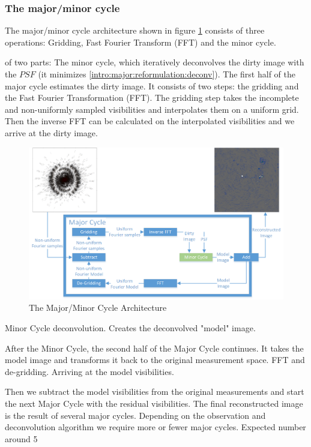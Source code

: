 \subsubsection{The major/minor cycle}
The major/minor cycle architecture shown in figure \ref{intro:major:fig} consists of three operations: Gridding, Fast Fourier Transform (FFT) and the minor cycle.

 of two parts: The minor cycle, which iteratively deconvolves the dirty image with the $PSF$ (it minimizes \eqref{intro:major:reformulation:deconv}). The first half of the major cycle estimates the dirty image. It consists of two steps: the gridding and the Fast Fourier Transformation (FFT). The gridding step takes the incomplete and non-uniformly sampled visibilities and interpolates them on a uniform grid. Then the inverse FFT can be calculated on the interpolated visibilities and we arrive at the dirty image.

\begin{figure}[h]
	\centering
	\includegraphics[width=0.90\linewidth]{./chapters/02.hypo/Major-Minor3.png}
	\caption{The Major/Minor Cycle Architecture}
	\label{intro:major:fig}
\end{figure}

Minor Cycle deconvolution. Creates the deconvolved "model" image.

After the Minor Cycle, the second half of the Major Cycle continues. It takes the model image and transforms it back to the original measurement space. FFT and de-gridding. Arriving at the model visibilities.

Then we subtract the model visibilities from the original measurements and start the next Major Cycle with the residual visibilities. The final reconstructed image is the result of several major cycles. Depending on the observation and deconvolution algorithm we require more or fewer major cycles. Expected number around 5

